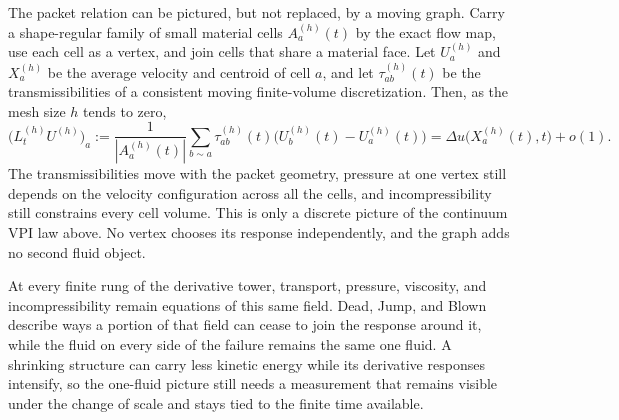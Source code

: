 
The packet relation can be pictured, but not replaced, by a moving graph.
Carry a shape-regular family of small material cells \(A_a^{(h)}(t)\) by the exact flow map, use each cell as a vertex, and join cells that share a material face.
Let \(U_a^{(h)}\) and \(X_a^{(h)}\) be the average velocity and centroid of cell \(a\), and let \(\tau_{ab}^{(h)}(t)\) be the transmissibilities of a consistent moving finite-volume discretization.
Then, as the mesh size \(h\) tends to zero,
\[
  \bigl(L_t^{(h)}U^{(h)}\bigr)_a
  :=
  \frac{1}{|A_a^{(h)}(t)|}
  \sum_{b\sim a}
  \tau_{ab}^{(h)}(t)
  \bigl(U_b^{(h)}(t)-U_a^{(h)}(t)\bigr)
  =
  \Delta u\bigl(X_a^{(h)}(t),t\bigr)+o(1).
\]
The transmissibilities move with the packet geometry, pressure at one vertex still depends on the velocity configuration across all the cells, and incompressibility still constrains every cell volume.
This is only a discrete picture of the continuum VPI law above.
No vertex chooses its response independently, and the graph adds no second fluid object.

At every finite rung of the derivative tower, transport, pressure, viscosity, and incompressibility remain equations of this same field.
Dead, Jump, and Blown describe ways a portion of that field can cease to join the response around it, while the fluid on every side of the failure remains the same one fluid.
A shrinking structure can carry less kinetic energy while its derivative responses intensify, so the one-fluid picture still needs a measurement that remains visible under the change of scale and stays tied to the finite time available.
